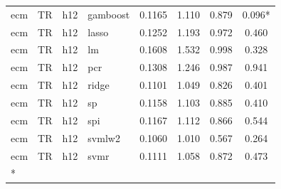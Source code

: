 \begin{ThreePartTable}
\begin{longtable}[t]{llclcccc}
ecm & TR & h12 & gamboost & 0.1165 & 1.110 & 0.879 & 0.096*\\
ecm & TR & h12 & lasso & 0.1252 & 1.193 & 0.972 & 0.460\\
ecm & TR & h12 & lm & 0.1608 & 1.532 & 0.998 & 0.328\\
ecm & TR & h12 & pcr & 0.1308 & 1.246 & 0.987 & 0.941\\
ecm & TR & h12 & ridge & 0.1101 & 1.049 & 0.826 & 0.401\\
ecm & TR & h12 & sp & 0.1158 & 1.103 & 0.885 & 0.410\\
ecm & TR & h12 & spi & 0.1167 & 1.112 & 0.866 & 0.544\\
ecm & TR & h12 & svmlw2 & 0.1060 & 1.010 & 0.567 & 0.264\\
ecm & TR & h12 & svmr & 0.1111 & 1.058 & 0.872 & 0.473\\*
\end{longtable}
\end{ThreePartTable}
\endgroup{}
